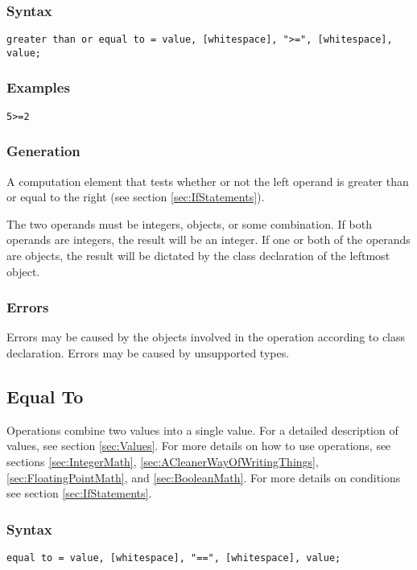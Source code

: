 \documentclass[10pt,a4paper]{article}
\begin{document}
\subsubsection{Syntax}
\begin{verbatim}
greater than or equal to = value, [whitespace], ">=", [whitespace], value;
\end{verbatim}

\subsubsection{Examples}
\begin{verbatim}
5>=2
\end{verbatim}

\subsubsection{Generation}
A computation element that tests whether or not the left operand is greater than or equal to the right (see section \ref{sec:IfStatements}).

The two operands must be integers, objects, or some combination. If both operands are integers, the result will be an integer. If one or both of the operands are objects, the result will be dictated by the class declaration of the leftmost object.

\subsubsection{Errors}
Errors may be caused by the objects involved in the operation according to class declaration. Errors may be caused by unsupported types.

\newpage




\subsection{Equal To}
Operations combine two values into a single value. For a detailed description of values, see section \ref{sec:Values}. For more details on how to use operations, see sections \ref{sec:IntegerMath}, \ref{sec:ACleanerWayOfWritingThings}, \ref{sec:FloatingPointMath}, and \ref{sec:BooleanMath}. For more details on conditions see section \ref{sec:IfStatements}.

\subsubsection{Syntax}
\begin{verbatim}
equal to = value, [whitespace], "==", [whitespace], value;
\end{verbatim}
\end{document}
